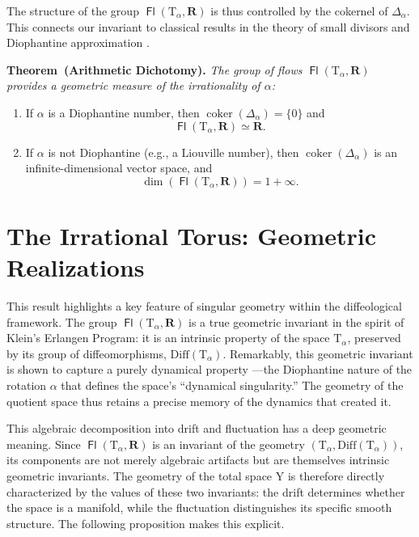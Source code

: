 \documentclass[10pt,letterpaper,reqno]{amsart}
\newenvironment{theorem}[1]%
{\noindent\textbf{Theorem#1.} \it}%
{}
\newcommand{\RR}{\mathbf{R}}
\newcommand{\T}{\mathrm{T}}
\newcommand{\Y}{\mathrm{Y}}
\DeclareMathOperator{\Fb}{\boldsymbol{\mathsf{Fl}}}
\newcommand{\coker}{\operatorname{coker}}
\newcommand{\Diff}{\mathrm{Diff}}
\begin{document}
  The structure of the group $\Fb(\T_\alpha, \RR)$ is thus controlled by the cokernel of $\Delta_\alpha$.
  This connects our invariant to classical results in the theory of small divisors and Diophantine approximation \cite{Arn65, Her79}.
  
  \begin{theorem}{~(Arithmetic Dichotomy)}
    The group of flows $\Fb(\T_\alpha, \RR)$ provides a geometric measure of the irrationality of $\alpha$:
    \begin{enumerate}
      \item If $\alpha$ is a Diophantine number, then $\coker(\Delta_\alpha) = \{0\}$ and
      $$
        \Fb(\T_\alpha, \RR) \simeq \RR.
        $$
      \item If $\alpha$ is not Diophantine (e.g., a Liouville number),
      then $\coker(\Delta_\alpha)$ is an infinite-dimensional vector space,
      and
      $$
        \dim(\Fb(\T_\alpha, \RR)) = 1 + \infty.
        $$
    \end{enumerate}
  \end{theorem}
  
  
  \section{The Irrational Torus: Geometric Realizations}
  
  This result highlights a key feature of singular geometry within the diffeological framework.
  The group $\Fb(\T_\alpha, \RR)$ is a true geometric invariant in the spirit of Klein's Erlangen Program:
  it is an intrinsic property of the space $\T_\alpha$,
  preserved by its group of diffeomorphisms,
  $\Diff(\T_\alpha)$.
  Remarkably,
  this geometric invariant is shown to capture a purely dynamical property
  ---the Diophantine nature of the rotation $\alpha$ that defines the space's ``dynamical singularity.''
  The geometry of the quotient space thus retains a precise memory of the dynamics that created it.
  
  This algebraic decomposition into drift and fluctuation has a deep geometric meaning.
  Since $\Fb(\T_\alpha, \RR)$ is an invariant of the geometry $(\T_\alpha, \Diff(\T_\alpha))$,
  its components are not merely algebraic artifacts but are themselves intrinsic geometric invariants.
  The geometry of the total space $\Y$ is therefore directly characterized by the values of these two invariants:
  the drift determines whether the space is a manifold,
  while the fluctuation distinguishes its specific smooth structure.
  The following proposition makes this explicit.
  
\end{document}
